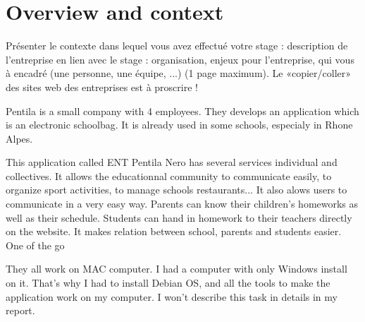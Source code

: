 
\section{Overview and context}

Présenter le contexte dans lequel vous avez effectué votre stage : description de l’entreprise en lien avec le stage : organisation, enjeux pour l’entreprise, qui vous à encadré (une personne, une équipe, ...) (1 page maximum). Le «copier/coller» des sites web des entreprises est à proscrire !
\newline

Pentila is a small company with 4 employees. They develops an application which is an electronic schoolbag. 
It is already used in some schools, especialy in Rhone Alpes. 

This application called ENT Pentila Nero has several services individual and collectives. 
It allows the educationnal community to communicate easily, to organize sport 
activities, to manage schools restaurants... 
It also alows users to communicate in a very easy way. Parents can know their 
children's homeworks as well as their schedule. Students can hand in homework to their 
teachers directly on the website. It makes relation between school, parents and students easier. 
One of the go

They all work on MAC computer. I had a computer with only Windows install on it. 
	That's why I had to install Debian OS, and all the tools to make the application work on my computer. I won't describe this task in details in my report. 





